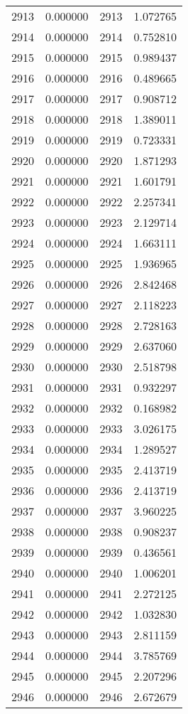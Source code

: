 \documentclass[12pt]{article}
\begin{document}
\begin{longtable}{@{}cccc@{}}
2913 & 0.000000 & 2913 & 1.072765 \\
2914 & 0.000000 & 2914 & 0.752810 \\
2915 & 0.000000 & 2915 & 0.989437 \\
2916 & 0.000000 & 2916 & 0.489665 \\
2917 & 0.000000 & 2917 & 0.908712 \\
2918 & 0.000000 & 2918 & 1.389011 \\
2919 & 0.000000 & 2919 & 0.723331 \\
2920 & 0.000000 & 2920 & 1.871293 \\
2921 & 0.000000 & 2921 & 1.601791 \\
2922 & 0.000000 & 2922 & 2.257341 \\
2923 & 0.000000 & 2923 & 2.129714 \\
2924 & 0.000000 & 2924 & 1.663111 \\
2925 & 0.000000 & 2925 & 1.936965 \\
2926 & 0.000000 & 2926 & 2.842468 \\
2927 & 0.000000 & 2927 & 2.118223 \\
2928 & 0.000000 & 2928 & 2.728163 \\
2929 & 0.000000 & 2929 & 2.637060 \\
2930 & 0.000000 & 2930 & 2.518798 \\
2931 & 0.000000 & 2931 & 0.932297 \\
2932 & 0.000000 & 2932 & 0.168982 \\
2933 & 0.000000 & 2933 & 3.026175 \\
2934 & 0.000000 & 2934 & 1.289527 \\
2935 & 0.000000 & 2935 & 2.413719 \\
2936 & 0.000000 & 2936 & 2.413719 \\
2937 & 0.000000 & 2937 & 3.960225 \\
2938 & 0.000000 & 2938 & 0.908237 \\
2939 & 0.000000 & 2939 & 0.436561 \\
2940 & 0.000000 & 2940 & 1.006201 \\
2941 & 0.000000 & 2941 & 2.272125 \\
2942 & 0.000000 & 2942 & 1.032830 \\
2943 & 0.000000 & 2943 & 2.811159 \\
2944 & 0.000000 & 2944 & 3.785769 \\
2945 & 0.000000 & 2945 & 2.207296 \\
2946 & 0.000000 & 2946 & 2.672679 \\

\end{longtable}
\end{document}
